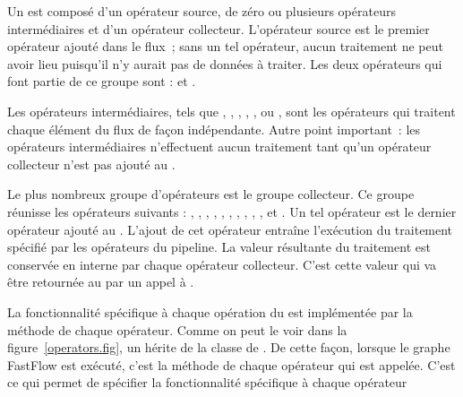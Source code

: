 Un  est compos\'e d'un op\'erateur source, de z\'ero ou plusieurs op\'erateurs interm\'ediaires et d'un op\'erateur collecteur. L'op\'erateur source est le premier op\'erateur ajout\'e dans le flux~; sans un tel op\'erateur, aucun traitement ne peut avoir lieu puisqu'il n'y aurait pas de données à traiter. Les deux op\'erateurs qui font partie de ce groupe sont :  et .

Les op\'erateurs interm\'ediaires, tels que , , , , ,  ou , sont les op\'erateurs qui traitent chaque \'el\'ement du flux de fa\c {c}on ind\'ependante. Autre point important~: les op\'erateurs interm\'ediaires n'effectuent aucun traitement tant qu'un op\'erateur collecteur n'est pas ajout\'e au . 



Le plus nombreux groupe d'op\'erateurs est le groupe collecteur. Ce groupe r\'eunisse les op\'erateurs suivants : , , , , , , , , , ,  et . Un tel op\'erateur est le dernier op\'erateur ajout\'e au . L'ajout de cet op\'erateur entra\^ine l'ex\'ecution du traitement spécifié par les opérateurs du pipeline. La valeur r\'esultante du traitement est conserv\'ee en interne par chaque op\'erateur collecteur. C'est cette valeur qui va \^etre retourn\'ee au  par un appel à .

La fonctionnalit\'e sp\'ecifique \`a chaque op\'eration du  est impl\'ement\'ee par la m\'ethode  de chaque op\'erateur. Comme on peut le voir dans la figure~\ref{operators.fig}, un  h\'erite de la classe  de . De cette fa\c {c}on, lorsque le graphe FastFlow est exécuté, c'est la méthode  de chaque op\'erateur qui est appel\'ee. C'est ce qui permet de spécifier la fonctionnalit\'e spécifique à chaque opérateur 








